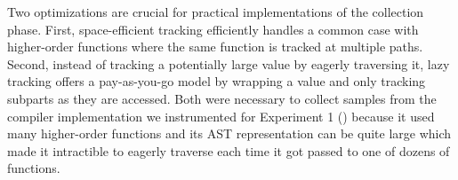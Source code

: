\label{infer:sec:extensions}

Two optimizations are crucial for practical implementations of the collection phase.
First, space-efficient tracking efficiently handles a common case with higher-order
functions where the same function is tracked at multiple paths.
Second, instead of tracking a potentially large value by eagerly traversing it, lazy tracking
offers a pay-as-you-go model by wrapping a value and only tracking subparts as they are accessed.
Both were necessary to collect samples from the compiler implementation we instrumented for
Experiment 1 ()
because it used many higher-order functions and its AST representation can be quite large
which made it intractible to eagerly traverse each time it got passed to one of dozens of functions.

